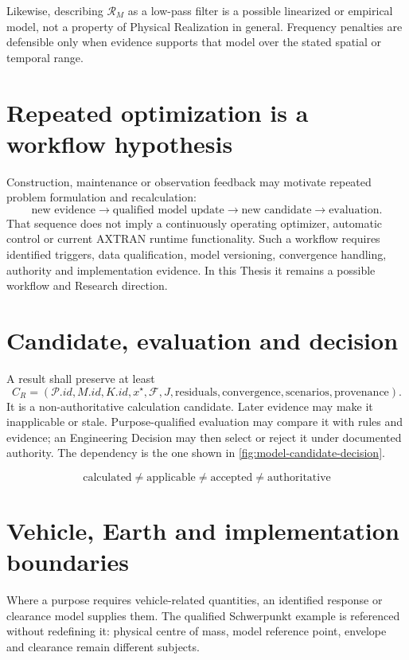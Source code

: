 Likewise, describing \(\mathcal R_M\) as a low-pass filter is a possible
linearized or empirical model, not a property of Physical Realization in
general. Frequency penalties are defensible only when evidence supports that
model over the stated spatial or temporal range.

\section{Repeated optimization is a workflow hypothesis}

Construction, maintenance or observation feedback may motivate repeated
problem formulation and recalculation:
\[
\text{new evidence}
\to\text{qualified model update}
\to\text{new candidate}
\to\text{evaluation}.
\]
That sequence does not imply a continuously operating optimizer, automatic
control or current AXTRAN runtime functionality. Such a workflow requires
identified triggers, data qualification, model versioning, convergence
handling, authority and implementation evidence. In this Thesis it remains a
possible workflow and Research direction.

\section{Candidate, evaluation and decision}

A result shall preserve at least
\[
C_R=
(\mathcal P.id,M.id,K.id,x^\star,\mathcal F,J,
\text{residuals},\text{convergence},\text{scenarios},\text{provenance}).
\]
It is a non-authoritative calculation candidate. Later evidence may make it
inapplicable or stale. Purpose-qualified evaluation may compare it with rules
and evidence; an Engineering Decision may then select or reject it under
documented authority. The dependency is the one shown in
\cref{fig:model-candidate-decision}.

\[
\boxed{\text{calculated}
\neq\text{applicable}
\neq\text{accepted}
\neq\text{authoritative}}
\]

\section{Vehicle, Earth and implementation boundaries}

Where a purpose requires vehicle-related quantities, an identified response or
clearance model supplies them. The qualified Schwerpunkt example is referenced
without redefining it: physical centre of mass, model reference point,
envelope and clearance remain different subjects.

